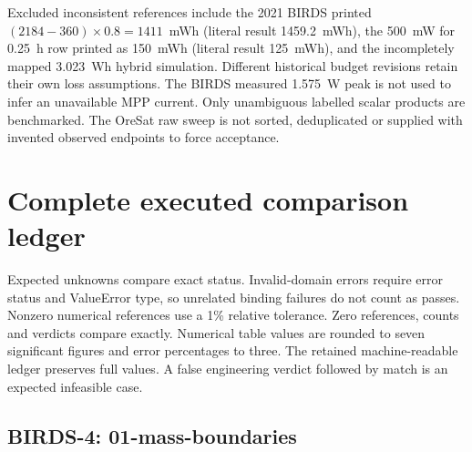 Excluded inconsistent references include the 2021 BIRDS printed
$(2184-360)\times0.8=1411$~mWh (literal result 1459.2~mWh),
the 500~mW for 0.25~h row printed as 150~mWh (literal result 125~mWh),
and the incompletely mapped 3.023~Wh hybrid simulation.
Different historical budget revisions retain their own loss assumptions.
The BIRDS measured 1.575~W peak is not used to infer an unavailable MPP current.
Only unambiguous labelled scalar products are benchmarked.
The OreSat raw sweep is not sorted, deduplicated or supplied with invented
observed endpoints to force acceptance.

\section{Complete executed comparison ledger}
Expected unknowns compare exact status. Invalid-domain errors require error
status and ValueError type, so unrelated binding failures do not count as passes.
Nonzero numerical references use a 1\% relative tolerance.
Zero references, counts and verdicts compare exactly.
Numerical table values are rounded to seven significant figures and error
percentages to three. The retained machine-readable ledger preserves full values.
A false engineering verdict followed by match is an expected infeasible case.


\subsection{BIRDS-4: 01-mass-boundaries}

